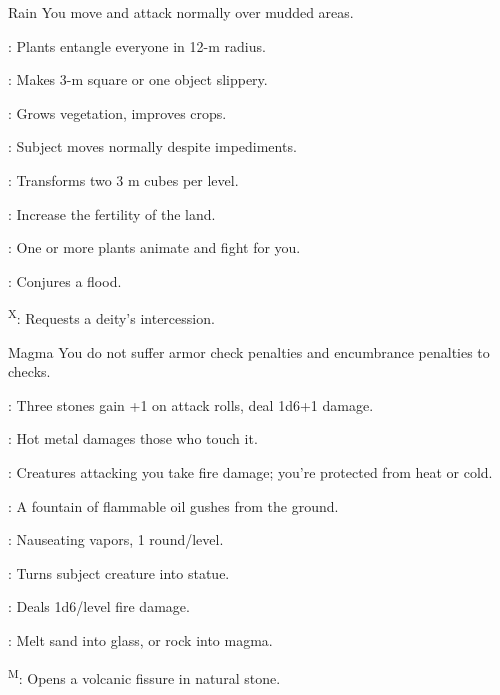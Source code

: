 {Rain}
{You move and attack normally over mudded areas.}
{
	\item {}: Plants entangle everyone in 12-m radius.
	\item {}: Makes 3-m square or one object slippery.
	\item {}: Grows vegetation, improves crops.
	\item {}: Subject moves normally despite impediments.
	\item {}: Transforms two 3 m cubes per level.
	\item {}: Increase the fertility of the land.
	\item {}: One or more plants animate and fight for you.
	\item {}: Conjures a flood.
	\item {}\textsuperscript{X}: Requests a deity's intercession.
}

{Magma}
{You do not suffer armor check penalties and encumbrance penalties to  checks.}
{
	\item {}: Three stones gain +1 on attack rolls, deal 1d6+1 damage.
	\item {}: Hot metal damages those who touch it.
	\item {}: Creatures attacking you take fire damage; you're protected from heat or cold.
	\item {}: A fountain of flammable oil gushes from the ground.
	\item {}: Nauseating vapors, 1 round/level.
	\item {}: Turns subject creature into statue.
	\item {}: Deals 1d6/level fire damage.
	\item {}: Melt sand into glass, or rock into magma.
	\item {}\textsuperscript{M}: Opens a volcanic fissure in natural stone.
}

